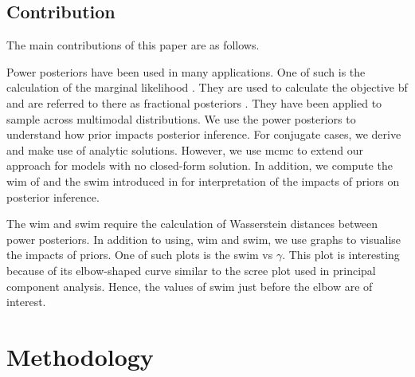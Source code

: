 \documentclass[12pt]{article}
\begin{document}
\subsection{}

\subsection{Contribution}

The main contributions of this paper are as follows.

Power posteriors have been used in many applications. One of such is the
calculation of the marginal likelihood \citep{friel2008marginal}. They are used
to calculate the objective \gls{bf} and are referred to there as fractional
posteriors \citep{ohaganPropertiesIntrinsicFractional1997}. They have been
applied to sample across multimodal distributions. We use the power posteriors
to understand how prior impacts posterior inference. For conjugate cases, we
derive and make use of analytic solutions. However, we use \gls{mcmc} to extend
our approach for models with no closed-form solution. In addition, we compute
the \gls{wim} of \citep{ghaderinezhadWassersteinImpactMeasure2022} and the
\gls{swim} introduced in for interpretation of the impacts of priors on
posterior inference. 


The \gls{wim} and \gls{swim} require the calculation of
Wasserstein distances between power posteriors. In addition to using, \gls{wim}
and \gls{swim}, we use graphs to visualise the impacts of priors. One of such
plots is the \gls{swim} vs $\gamma$. This plot is interesting because of its
elbow-shaped curve similar to the scree plot used in principal component
analysis. Hence, the values of \gls{swim} just before the elbow are of
interest.

\section{Methodology}
\end{document}
